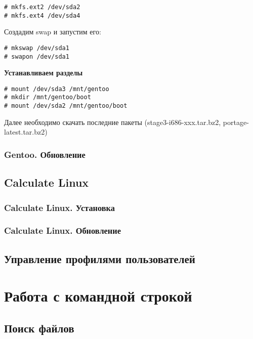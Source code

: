 \documentclass[12pt, a4paper]{article}
\begin{document}
\begin{verbatim}
# mkfs.ext2 /dev/sda2
# mkfs.ext4 /dev/sda4
\end{verbatim}

Создадим swap и запустим его:

\begin{verbatim}
# mkswap /dev/sda1
# swapon /dev/sda1
\end{verbatim}

{\bf Устанавливаем разделы}

\begin{verbatim}
# mount /dev/sda3 /mnt/gentoo
# mkdir /mnt/gentoo/boot
# mount /dev/sda2 /mnt/gentoo/boot
\end{verbatim}

Далее необходимо скачать последние пакеты (stage3-i686-xxx.tar.bz2, portage-latest.tar.bz2)



\subsubsection{Gentoo. Обновление}

\subsection{Calculate Linux}

\subsubsection{Calculate Linux. Установка}
\subsubsection{Calculate Linux. Обновление}

\subsection{Управление профилями пользователей}

\newpage 

\section{Работа с командной строкой}

\subsection{Поиск файлов}
\end{document}
